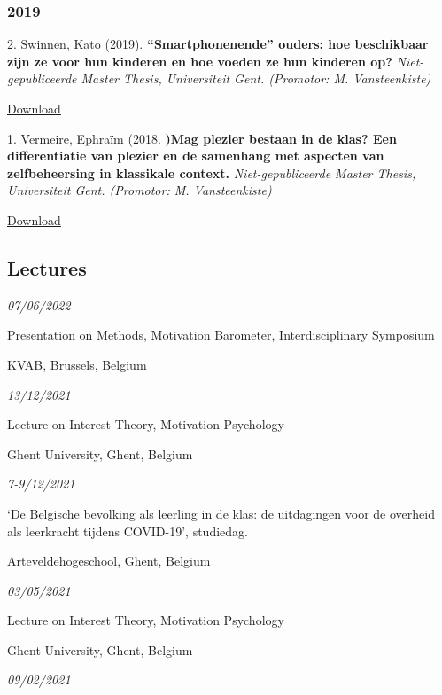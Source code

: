 \documentclass[
]{article}
\begin{document}
\hypertarget{section-9}{%
\subsubsection{2019}\label{section-9}}

2. Swinnen, Kato (2019). \textbf{``Smartphonenende'' ouders: hoe
beschikbaar zijn ze voor hun kinderen en hoe voeden ze hun kinderen op?}
\emph{Niet-gepubliceerde Master Thesis, Universiteit Gent. (Promotor: M.
Vansteenkiste)}

\href{download/sciencs/masterproeven/MASTERPROEF\%20II_Kato\%20Swinnen_Smartphonende\%20ouders\%20Hoe\%20beschikbaar\%20zijn\%20ze\%20voor\%20hun\%20kinderen\%20en\%20hoe\%20voeden\%20ze\%20hun\%20kinderen\%20op.pdf}{Download
}

1. Vermeire, Ephraïm (2018. \textbf{)Mag plezier bestaan in de klas? Een
differentiatie van plezier en de samenhang met aspecten van
zelfbeheersing in klassikale context.} \emph{Niet-gepubliceerde Master
Thesis, Universiteit Gent. (Promotor: M. Vansteenkiste)}

\href{download/sciencs/masterproeven/Ephraïm\%20Vermeire\%20(2018)\%20-\%20Twee\%20vormen\%20van\%20plezier\%20en\%20zelfbeheersing.pdf}{Download
}

\hypertarget{lectures}{%
\subsection{Lectures}\label{lectures}}

\emph{07/06/2022}

Presentation on Methods, Motivation Barometer, Interdisciplinary
Symposium

KVAB, Brussels, Belgium

\emph{13/12/2021}

Lecture on Interest Theory, Motivation Psychology

Ghent University, Ghent, Belgium

\emph{7-9/12/2021}

`De Belgische bevolking als leerling in de klas: de uitdagingen voor de
overheid als leerkracht tijdens COVID-19', studiedag.

Arteveldehogeschool, Ghent, Belgium

\emph{03/05/2021}

Lecture on Interest Theory, Motivation Psychology

Ghent University, Ghent, Belgium

\emph{09/02/2021}
\end{document}
